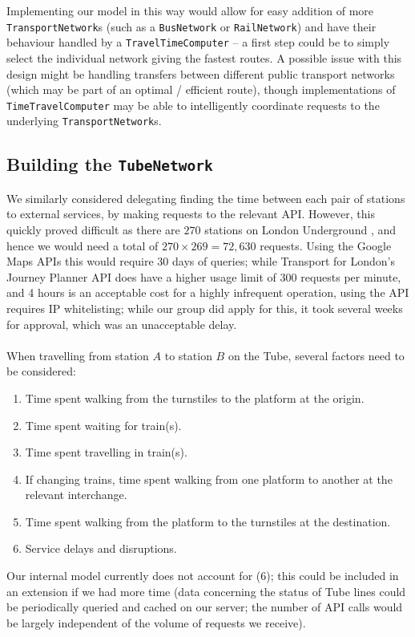 \documentclass[a4paper, 10pt]{report}
\begin{document}
Implementing our model in this way would allow for easy addition of more \texttt{TransportNetwork}s (such as a \texttt{BusNetwork} or \texttt{RailNetwork}) and have their behaviour handled by a \texttt{TravelTimeComputer} -- a first step could be to simply select the individual network giving the fastest routes. A possible issue with this design might be handling transfers between different public transport networks (which may be part of an optimal / efficient route), though implementations of \texttt{TimeTravelComputer} may be able to intelligently coordinate requests to the underlying \texttt{TransportNetwork}s.

\subsection{Building the \texttt{TubeNetwork}}
We similarly considered delegating finding the time between each pair of stations to external services, by making requests to the relevant API. However, this quickly proved difficult as there are $270$ stations on London Underground \cite{tube-stat}, and hence we would need a total of $270 \times 269 = 72,630$ requests. Using the Google Maps APIs this would require 30 days of queries; while Transport for London's Journey Planner API does have a higher usage limit of 300 requests per minute, and 4 hours is an acceptable cost for a highly infrequent operation, using the API requires IP whitelisting; while our group did apply for this, it took several weeks for approval, which was an unacceptable delay. \\\\
When travelling from station $A$ to station $B$ on the Tube, several factors need to be considered:
\begin{enumerate}
\item Time spent walking from the turnstiles to the platform at the origin.
\item Time spent waiting for train(s).
\item Time spent travelling in train(s).
\item If changing trains, time spent walking from one platform to another at the relevant interchange.
\item Time spent walking from the platform to the turnstiles at the destination.
\item Service delays and disruptions.
\end{enumerate}
Our internal model currently does not account for (6); this could be included in an extension if we had more time (data concerning the status of Tube lines could be periodically queried and cached on our server; the number of API calls would be largely independent of the volume of requests we receive). \\\\
\end{document}
